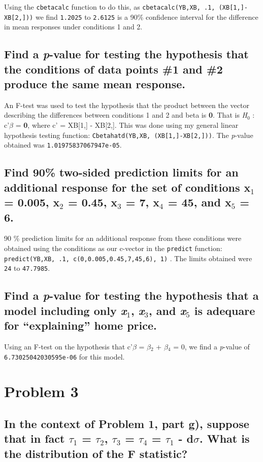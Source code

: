 \documentclass[11pt]{article}
\begin{document}
Using the \verb~cbetacalc~ function to do this, as \verb~cbetacalc(YB,XB, .1, (XB[1,]-XB[2,]))~ we find \texttt{1.2025} 
to \texttt{2.6125} is a 90\% confidence interval for the
difference in mean responses under conditions 1 and 2.
\subsection{Find a \emph{p}-value for testing the hypothesis that the conditions of data points \#1 and \#2 produce the same mean response.}
\label{sec-2-4}


An F-test was used to test the hypothesis that the product between the vector describing
the differences between conditions 1 and 2 and beta is \textbf{0}. That is
\emph{H$_0$} : c'$\beta$ = \textbf{0}, where c' = XB[1,] - XB[2,]. This was done using
my general linear hypothesis testing function: \verb~Cbetahatd(YB,XB, (XB[1,]-XB[2,]))~. The \emph{p}-value obtained was \texttt{1.01975837067947e-05}.
\subsection{Find 90\% two-sided prediction limits for an additional response for the set of conditions x$_1$ = 0.005, x$_2$ = 0.45, x$_3$ = 7, x$_4$ = 45, and x$_5$ = 6.}
\label{sec-2-5}


90 \% prediction limits for an additional response from these
conditions were obtained using the conditions as our c-vector in the
\verb~predict~ function: \verb~predict(YB,XB, .1, c(0,0.005,0.45,7,45,6), 1)~ .
The limits obtained were 
\texttt{24} to
\texttt{47.7985}.
\subsection{Find a \emph{p}-value for testing the hypothesis that a model including only \emph{x$_1$}, \emph{x$_3$}, and \emph{x$_5$} is adequare for ``explaining'' home price.}
\label{sec-2-6}


 Using an F-test on the hypothesis that c'$\beta$ = $\beta$$_2$ + $\beta$$_4$ =
 0, we find a \emph{p}-value of
 \texttt{6.73025042030595e-06} for this model.
\section{Problem 3}
\label{sec-3}
\subsection{In the context of Problem 1, part g), suppose that in fact $\tau$$_1$ = $\tau$$_2$, $\tau$$_3$ = $\tau$$_4$ = $\tau$$_1$ - d$\sigma$. What is the distribution of the F statistic?}
\label{sec-3-1}
\end{document}

